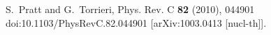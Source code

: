 \begin{thebibliography}{99}
S.~Pratt and G.~Torrieri,
Phys. Rev. C \textbf{82} (2010), 044901
doi:10.1103/PhysRevC.82.044901
[arXiv:1003.0413 [nucl-th]].
\end{thebibliography}

